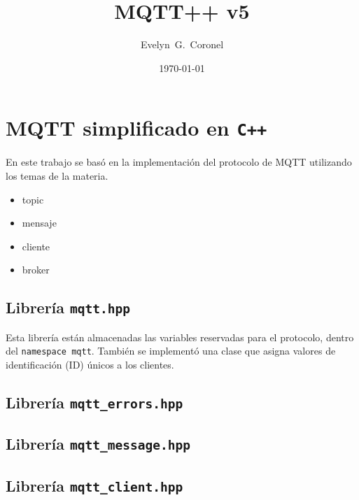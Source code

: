 


\title{MQTT++ v5}
\author{Evelyn~G.~Coronel}


\date[]{\lowercase{\today}} %

\maketitle

\section{MQTT simplificado en \texttt{C++}}

En este trabajo se basó en la implementación del protocolo de MQTT utilizando los temas de la materia. 

\begin{itemize}
    \item topic
    \item mensaje
    \item cliente
    \item broker
\end{itemize}






\subsection{Librería \texttt{mqtt.hpp}}

Esta  librería están almacenadas las variables reservadas para el protocolo, dentro del \texttt{namespace mqtt}. También se implementó una clase que asigna valores de identificación (ID) únicos a los clientes.

\subsection{Librería \texttt{mqtt\_errors.hpp}}

\subsection{Librería \texttt{mqtt\_message.hpp}}

\subsection{Librería \texttt{mqtt\_client.hpp}}


